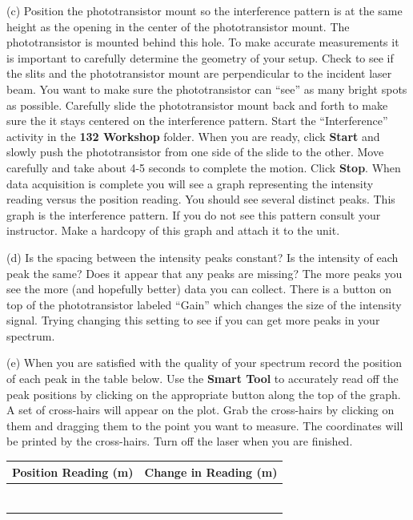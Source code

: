 (c) Position the phototransistor mount so the interference pattern
is at the same height as the opening in the center of the
phototransistor mount. The phototransistor is mounted behind this hole.
To make accurate measurements it is important
to carefully determine the geometry of your setup. Check to see if
the slits and the phototransistor mount are perpendicular to the incident
laser beam. 
You want to make sure the phototransistor can {}``see'' as many
bright spots as possible. Carefully slide the phototransistor mount back and forth to
make sure the it stays centered on the interference pattern.
Start the ``Interference'' activity in the {\bf 132 Workshop} folder. 
When you are ready, click {\bf Start}
and slowly push the phototransistor from one side of the slide to
the other. Move carefully and take about 4-5 seconds to complete the
motion. Click {\bf Stop}.
When data acquisition is complete you will see a graph representing
the intensity reading versus the position reading. You should see
several distinct peaks. This graph is the interference pattern. If
you do not see this pattern consult your instructor. Make a hardcopy
of this graph and attach it to the unit.

(d) Is the spacing between the intensity peaks constant? Is the intensity
of each peak the same? Does it appear that any peaks are missing?
The more peaks you see the more (and hopefully better) data you can collect.
There is a button on top of the phototransistor labeled ``Gain'' which changes
the size of the intensity signal.
Trying changing this setting to see if you can get more peaks in your spectrum.
\vspace{15mm}

(e) When you are satisfied with the quality of your spectrum record the position of 
each peak in the table below.
Use the
{\bf Smart Tool} to accurately read off the peak positions by clicking on the
appropriate button along the top of the graph. A set of cross-hairs will appear on the
plot. Grab the cross-hairs by clicking on them and dragging them to the point you want
to measure.
The coordinates will be printed by the cross-hairs.
Turn off the laser when you are finished.

\vspace{0.3cm}
{\centering \begin{tabular}{|c|c|}
\hline 
Position Reading (m)&
Change in Reading (m)\\
\hline
\hline 
&
\\
\hline 
&
\\
\hline 
&
\\
\hline 
&
\\
\hline 
&
\\
\hline 
&
\\
\hline 
&
\\
\hline
\end{tabular}\par}
\vspace{0.3cm}

